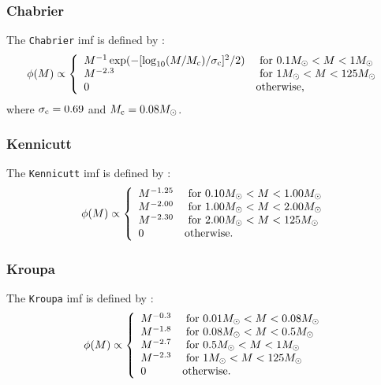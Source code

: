 \subsubsection{Chabrier}

The {\tt Chabrier} \gls{imf} is defined by \citep{chabrier_galactic_2001}:
\begin{equation}
 \phi(M) \propto \left\{ \begin{array}{ll}
 M^{-1} \exp(-[\log_{10}(M/M_{\rm c})/\sigma_{\rm c}]^2/2) & \hbox{ for } 0.1M_\odot < M < 1M_\odot \\
 M^{-2.3} & \hbox{ for } 1M_\odot < M < 125M_\odot \\
 0 & \hbox {otherwise,} \end{array} \right.
\end{equation}
where $\sigma_{\rm c}=0.69$ and $M_{\rm c}=0.08M_\odot$.

\subsubsection{Kennicutt}

The {\tt Kennicutt} \gls{imf} is defined by \citep{kennicutt_rate_1983}:
\begin{equation}
 \phi(M) \propto \left\{ \begin{array}{ll}
 M^{-1.25} & \hbox{ for } 0.10M_\odot < M < 1.00M_\odot \\
 M^{-2.00} & \hbox{ for } 1.00M_\odot < M < 2.00M_\odot \\
 M^{-2.30} & \hbox{ for } 2.00M_\odot < M < 125M_\odot \\
 0 & \hbox {otherwise.} \end{array} \right.
\end{equation}

\subsubsection{Kroupa}

The {\tt Kroupa} \gls{imf} is defined by \citep{kroupa_variation_2001}:
\begin{equation}
 \phi(M) \propto \left\{ \begin{array}{ll}
 M^{-0.3} & \hbox{ for } 0.01M_\odot < M < 0.08M_\odot \\ 
 M^{-1.8} & \hbox{ for } 0.08M_\odot < M < 0.5M_\odot \\ 
 M^{-2.7} & \hbox{ for } 0.5M_\odot < M < 1M_\odot \\ 
 M^{-2.3} & \hbox{ for } 1M_\odot < M < 125M_\odot \\ 
0 & \hbox {otherwise.} \end{array} \right.
\end{equation}

